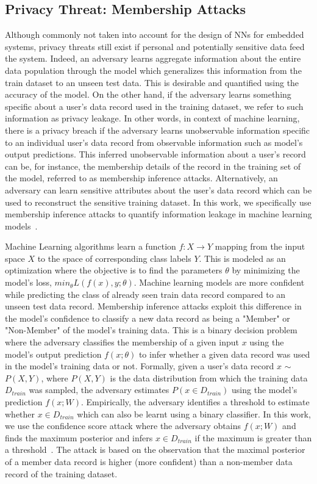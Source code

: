 \subsection{Privacy Threat: Membership Attacks}
\label{threatmodel}


Although commonly not taken into account for the design of NNs for embedded systems, privacy threats still exist if personal and potentially sensitive data feed the system.
Indeed, an adversary learns aggregate information about the entire data population through the model which generalizes this information from the train dataset to an unseen test data.
This is desirable and quantified using the accuracy of the model.
On the other hand, if the adversary learns something specific about a user's data record used in the training dataset, we refer to such information as privacy leakage.
In other words, in context of machine learning, there is a privacy breach if the adversary learns unobservable information specific to an individual user's data record from observable information such as model's output predictions.
This inferred unobservable information about a user's record can be, for instance, the membership details of the record in the training set of the model, referred to as membership inference attacks.
Alternatively, an adversary can learn sensitive attributes about the user's data record which can be used to reconstruct the sensitive training dataset.
In this work, we specifically use membership inference attacks to quantify information leakage in machine learning models~\cite{shokri2017membership}.


Machine Learning algorithms learn a function $f:X \rightarrow Y$ mapping from the input space $X$ to the space of corresponding class labels $Y$.
This is modeled as an optimization where the objective is to find the parameters $\theta$ by minimizing the model's loss, $min_{\theta} L(f(x),y;\theta)$.
Machine learning models are more confident while predicting the class of already seen train data record compared to an unseen test data record.
Membership inference attacks exploit this difference in the model's confidence to classify a new data record as being a "Member" or "Non-Member" of the model's training data.
This is a binary decision problem where the adversary classifies the membership of a given input $x$ using the model's output prediction $f(x;\theta)$ to infer whether a given data record was used in the model's training data or not.
Formally, given a user's data record $x$ $\sim$ $P(X,Y)$, where $P(X,Y)$ is the data distribution from which the training data $D_{train}$ was sampled, the adversary estimates $P(x \in D_{train})$ using the model's prediction $f(x;W)$.
Empirically, the adversary identifies a threshold to estimate whether $x \in D_{train}$ which can also be learnt using a binary classifier.
In this work, we use the confidence score attack where the adversary obtains $f(x;W)$ and finds the maximum posterior and infers $x \in D_{train}$ if the maximum is greater than a threshold~\cite{salem2018ml,8429311}.
The attack is based on the observation that the maximal posterior of a member data record is higher (more confident) than a non-member data record of the training dataset.



